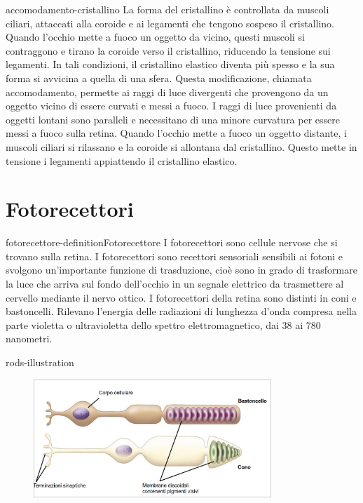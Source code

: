 \documentclass[preview]{standalone}
\begin{document}
\begin{snippet}{accomodamento-cristallino}
    La forma del cristallino è controllata da muscoli ciliari, attaccati alla coroide e ai legamenti
che tengono sospeso il cristallino. Quando l'occhio mette a fuoco un oggetto da vicino,
questi muscoli si contraggono e tirano la coroide verso il cristallino, riducendo la tensione
sui legamenti. In tali condizioni, il cristallino elastico diventa più spesso e la sua forma si
avvicina a quella di una sfera. Questa modificazione, chiamata accomodamento, permette
ai raggi di luce divergenti che provengono da un oggetto vicino di essere curvati e messi a
fuoco. I raggi di luce provenienti da oggetti lontani sono paralleli e necessitano di una minore
curvatura per essere messi a fuoco sulla retina. Quando l'occhio mette a fuoco un oggetto
distante, i muscoli ciliari si rilassano e la coroide si allontana dal cristallino. Questo mette in
tensione i legamenti appiattendo il cristallino elastico.
\end{snippet}

\section{Fotorecettori}

\begin{snippetdefinition}{fotorecettore-definition}{Fotorecettore}
    I fotorecettori sono cellule nervose che si trovano sulla retina. I fotorecettori sono recettori
    sensoriali sensibili ai fotoni e svolgono un'importante funzione di trasduzione, cioè sono in
    grado di trasformare la luce che arriva sul fondo dell'occhio in un segnale elettrico da
    trasmettere al cervello mediante il nervo ottico. I fotorecettori della retina sono distinti in coni
    e bastoncelli. Rilevano l'energia delle radiazioni di lunghezza d'onda compresa nella parte
    violetta o ultravioletta dello spettro elettromagnetico, dai 38 ai 780 nanometri.
\end{snippetdefinition}



\begin{snippet}{rods-illustration}
    \begin{center}
    \begin{figure}[ht]
        \centering
        \includegraphics[width=0.8\textwidth]{./resources/rods.png}
    \end{figure}
    \end{center}
\end{snippet}
\end{document}

